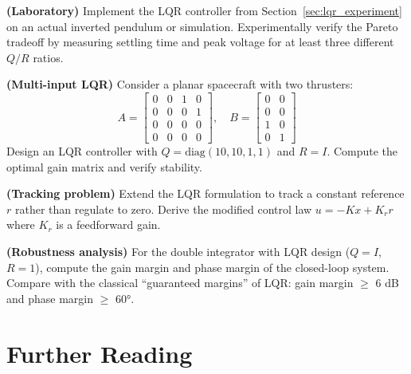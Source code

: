 \begin{exercise}
\textbf{(Laboratory)} Implement the LQR controller from Section~\ref{sec:lqr_experiment} on an actual inverted pendulum or simulation. Experimentally verify the Pareto tradeoff by measuring settling time and peak voltage for at least three different $Q/R$ ratios.
\end{exercise}

\begin{exercise}
\textbf{(Multi-input LQR)} Consider a planar spacecraft with two thrusters:
\begin{equation}
A = \begin{bmatrix} 0 & 0 & 1 & 0 \\ 0 & 0 & 0 & 1 \\ 0 & 0 & 0 & 0 \\ 0 & 0 & 0 & 0 \end{bmatrix}, \quad
B = \begin{bmatrix} 0 & 0 \\ 0 & 0 \\ 1 & 0 \\ 0 & 1 \end{bmatrix}
\end{equation}
Design an LQR controller with $Q = \text{diag}(10, 10, 1, 1)$ and $R = I$. Compute the optimal gain matrix and verify stability.
\end{exercise}

\begin{exercise}
\textbf{(Tracking problem)} Extend the LQR formulation to track a constant reference $r$ rather than regulate to zero. Derive the modified control law $u = -Kx + K_r r$ where $K_r$ is a feedforward gain.
\end{exercise}

\begin{exercise}
\textbf{(Robustness analysis)} For the double integrator with LQR design ($Q = I$, $R = 1$), compute the gain margin and phase margin of the closed-loop system. Compare with the classical ``guaranteed margins'' of LQR: gain margin $\geq$ 6 dB and phase margin $\geq$ 60°.
\end{exercise}


\section*{Further Reading}

